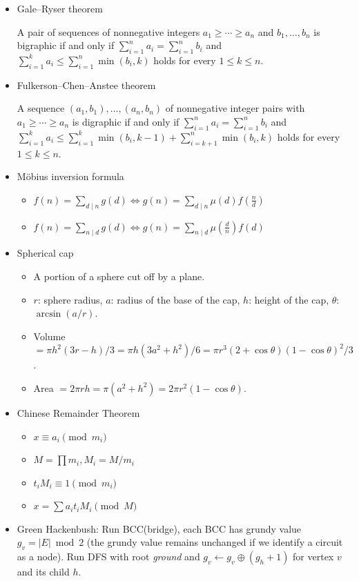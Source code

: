 \begin{itemize}
\item Gale–Ryser theorem

A pair of sequences of nonnegative integers $a_1\ge\cdots\ge a_n$ and $b_1,\ldots,b_n$ is bigraphic if and only if $\displaystyle\sum_{i=1}^n a_i=\displaystyle\sum_{i=1}^n b_i$ and $\displaystyle\sum_{i=1}^k a_i\le \displaystyle\sum_{i=1}^n\min(b_i,k)$ holds for every $1\le k\le n$.

\item Fulkerson–Chen–Anstee theorem

A sequence $(a_1,b_1),\ldots,(a_n,b_n)$ of nonnegative integer pairs with $a_1\ge\cdots\ge a_n$ is digraphic if and only if $\displaystyle\sum_{i=1}^n a_i=\displaystyle\sum_{i=1}^n b_i$ and $\displaystyle\sum_{i=1}^k a_i\le \displaystyle\sum_{i=1}^k\min(b_i,k-1)+\displaystyle\sum_{i=k+1}^n\min(b_i,k)$ holds for every $1\le k\le n$.

\item Möbius inversion formula

\begin{itemize}
    \itemsep-0.5em
  \item $f(n)=\sum_{d\mid n}g(d)\Leftrightarrow g(n)=\sum_{d\mid n}\mu(d)f(\frac{n}{d})$
  \item $f(n)=\sum_{n\mid d}g(d)\Leftrightarrow g(n)=\sum_{n\mid d}\mu(\frac{d}{n})f(d)$
\end{itemize}

\item Spherical cap

\begin{itemize}
    \itemsep-0.5em
  \item A portion of a sphere cut off by a plane.
  \item $r$: sphere radius, $a$: radius of the base of the cap, $h$: height of the cap, $\theta$: $\arcsin(a/r)$.
  \item Volume $=\pi h^2(3r-h)/3=\pi h(3a^2+h^2)/6=\pi r^3(2+\cos\theta)(1-\cos\theta)^2/3$.
  \item Area $=2\pi rh=\pi(a^2+h^2)=2\pi r^2(1-\cos\theta)$.
\end{itemize}

\item Chinese Remainder Theorem

\begin{itemize}
  \item $x \equiv a_i \pmod {m_i}$
  \item $M = \prod m_i, M_i = M / m_i$
  \item $t_iM_i \equiv 1 \pmod {m_i}$
  \item $x = \sum a_it_iM_i \pmod M$
\end{itemize}

\item Green Hackenbush: Run BCC(bridge), each BCC has grundy value $g_v = |E| \bmod 2$ (the grundy value remains unchanged if we identify a circuit as a node). Run DFS with root \textit{ground} and $g_v \leftarrow g_v \mathrel{\oplus} (g_h + 1)$ for vertex $v$ and its child $h$.  
\end{itemize}
